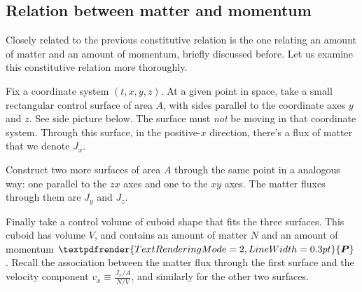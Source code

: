 \documentclass[a4paper,12pt,%
onecolumn,oneside,titlepage,%
british%
]{memoir}
\renewcommand*{\bm}[1]{\textpdfrender{TextRenderingMode=2,LineWidth=0.3pt}{\boldsymbol{#1}}}
\renewcommand*{\|}[1][]{\nonscript\:#1\vert\nonscript\:\mathopen{}}
\newcommand*{\sect}{\S}%
\newcommand*{\yv}{\bm{v}}
\newcommand*{\yN}{N}
\newcommand*{\yJ}{J}
\newcommand*{\yrho}{\rho}
\newcommand*{\yM}{m}%
\newcommand*{\yP}{\bm{P}}
\begin{document}
\subsection{Relation between matter and momentum}
\label{nsec:const_matter_momentum}

Closely related to the previous constitutive relation is the one {relating an amount of matter and an amount of momentum}, briefly discussed before. Let us examine this constitutive relation more thoroughly.

Fix a coordinate system $(t,x,y,z)$. At a given point in space, take a small rectangular control surface of area $A$, with sides parallel to the coordinate axes $y$ and $z$. See side picture below. The surface must \emph{not} be moving in that coordinate system. Through this surface, in the positive-$x$ direction, there's a flux of matter that we denote $J_{x}$.

Construct two more surfaces of area $A$ through the same point in a analogous way: one parallel to the $zx$ axes and one to the $xy$ axes. The matter fluxes through them are $J_{y}$ and $J_{z}$.

Finally take a control volume of cuboid shape that fits the three surfaces. This cuboid has volume $V$, and contains an amount of matter $\yN$ and an amount of momentum $\yP$. Recall the {association between the matter flux} through the first surface and the velocity component $v_{x} \equiv \frac{J_{x}/A}{\yN/V}$, and similarly for the other two surfaces.

%
%
\end{document}
